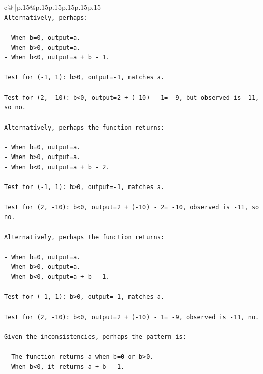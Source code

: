 \documentclass{article}
\begin{document}
{\begin{supertabular}{c@{$\;$}|p{.15\linewidth}@{}p{.15\linewidth}p{.15\linewidth}p{.15\linewidth}p{.15\linewidth}p{.15\linewidth}}
{{{\\ 
\texttt{Alternatively, perhaps:} \\
\\ 
\texttt{{-} When b=0, output=a.} \\
\texttt{{-} When b>0, output=a.} \\
\texttt{{-} When b<0, output=a + b {-} 1.} \\
\\ 
\texttt{Test for ({-}1, 1): b>0, output={-}1, matches a.} \\
\\ 
\texttt{Test for (2, {-}10): b<0, output=2 + ({-}10) {-} 1= {-}9, but observed is {-}11, so no.} \\
\\ 
\texttt{Alternatively, perhaps the function returns:} \\
\\ 
\texttt{{-} When b=0, output=a.} \\
\texttt{{-} When b>0, output=a.} \\
\texttt{{-} When b<0, output=a + b {-} 2.} \\
\\ 
\texttt{Test for ({-}1, 1): b>0, output={-}1, matches a.} \\
\\ 
\texttt{Test for (2, {-}10): b<0, output=2 + ({-}10) {-} 2= {-}10, observed is {-}11, so no.} \\
\\ 
\texttt{Alternatively, perhaps the function returns:} \\
\\ 
\texttt{{-} When b=0, output=a.} \\
\texttt{{-} When b>0, output=a.} \\
\texttt{{-} When b<0, output=a + b {-} 1.} \\
\\ 
\texttt{Test for ({-}1, 1): b>0, output={-}1, matches a.} \\
\\ 
\texttt{Test for (2, {-}10): b<0, output=2 + ({-}10) {-} 1= {-}9, observed is {-}11, no.} \\
\\ 
\texttt{Given the inconsistencies, perhaps the pattern is:} \\
\\ 
\texttt{{-} The function returns a when b=0 or b>0.} \\
\texttt{{-} When b<0, it returns a + b {-} 1.} \\
}}}
\end{supertabular}}
\end{document}
